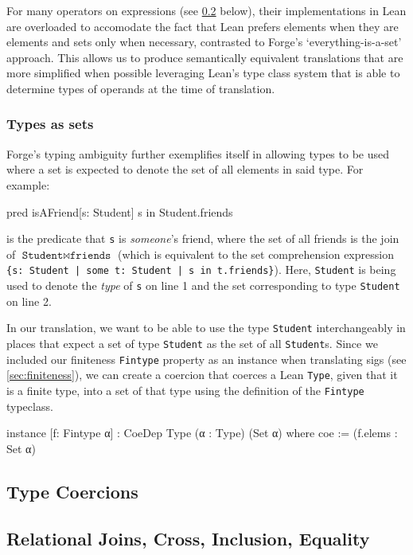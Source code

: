 For many operators on expressions (see \cref{sec:join-cross-subset} below), their implementations in Lean are overloaded to accomodate the fact that Lean prefers elements when they are elements and sets only when necessary, contrasted to Forge's `everything-is-a-set' approach. This allows us to produce semantically equivalent translations that are more simplified when possible leveraging Lean's type class system that is able to determine types of operands at the time of translation. 

\subsubsection{Types as sets}
Forge's typing ambiguity further exemplifies itself in allowing types to be used where a set is expected to denote the set of all elements in said type. For example:
\begin{forge}
pred isAFriend[s: Student] {
  s in Student.friends
}
\end{forge}
is the predicate that \texttt{s} is \emph{someone}'s friend, where the set of all friends is the join of $\texttt{Student} \bowtie \texttt{friends}$ (which is equivalent to the set comprehension expression \texttt{\{s: Student | some t: Student | s in t.friends\}}). Here, \texttt{Student} is being used to denote the \emph{type} of \texttt{s} on line 1 and the set corresponding to type \texttt{Student} on line 2. 

In our translation, we want to be able to use the type \texttt{Student} interchangeably in places that expect a set of type \texttt{Student} as the set of all \texttt{Student}s. Since we included our finiteness \texttt{Fintype} property as an instance when translating sigs (see \cref{sec:finiteness}), we can create a coercion that coerces a Lean \texttt{Type}, given that it is a finite type, into a set of that type using the definition of the \texttt{Fintype} typeclass. 
\begin{leanimpl*}
instance [f: Fintype α] : CoeDep Type (α : Type) (Set α) where
  coe := (f.elems : Set α)
\end{leanimpl*}

\subsection{Type Coercions}\label{sec:type-coercions}

\subsection{Relational Joins, Cross, Inclusion, Equality}\label{sec:join-cross-subset}

